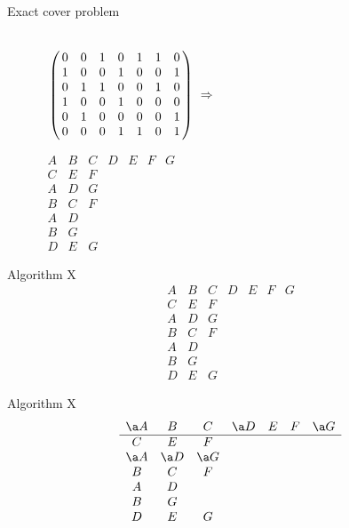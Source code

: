 \documentclass[xcolor=svgnames]{beamer}
\begin{document}
%
\begin{frame}{Exact cover problem}
\Large\boldmath
  \begin{figure}[!htb]
    \hskip-17mm\begin{minipage}{.7\textwidth}
      \centering
      $\bordermatrix{
  \strut&&&&&&&\cr
  &0&0&1&0&1&1&0\cr
  &1&0&0&1&0&0&1\cr
  &0&1&1&0&0&1&0\cr
  &1&0&0&1&0&0&0\cr
  &0&1&0&0&0&0&1\cr
  &0&0&0&1&1&0&1}\ \Rightarrow$
    \end{minipage}%
    \begin{minipage}{.3\textwidth}
      \centering
  $
  \begin{array}{ccccccc}
    A & B & C & D & E & F & G\\
    \hline
    C & E & F &&&&\\
    A & D & G &&&&\\
    B & C & F &&&&\\
    A & D &&&&&\\
    B & G &&&&&\\
    D & E & G &&&&
  \end{array}
  $
    \end{minipage}
\end{figure}
\end{frame}

\renewcommand\arraystretch{1.3}
%
\begin{frame}{Algorithm X}
\Large\boldmath
  $$
  \begin{array}{ccccccc}
    A & B & C & D & E & F & G\\
    \hline
    C & E & F &&&&\\
    A & D & G &&&&\\
    B & C & F &&&&\\
    A & D &&&&&\\
    B & G &&&&&\\
    D & E & G &&&&
  \end{array}
  $$
\end{frame}

%
\begin{frame}{Algorithm X}
\Large\boldmath
  $$
  \begin{array}{ccccccc}
    \a A & B & C & \a D & E & F & \a G\\
    \hline
    C & E & F &&&&\\
    \a A & \a D & \a G &&&&\\
    B & C & F &&&&\\
    A & D &&&&&\\
    B & G &&&&&\\
    D & E & G &&&&
  \end{array}
  $$
\end{frame}
\end{document}
